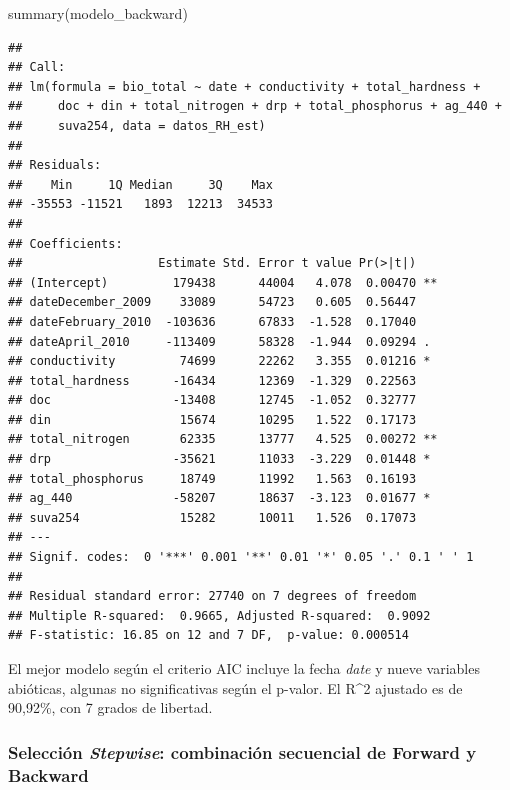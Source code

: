 \documentclass[
]{book}
\newenvironment{Shaded}{\begin{snugshade}}{\end{snugshade}}
\newcommand{\FunctionTok}[1]{\textcolor[rgb]{0.00,0.00,0.00}{#1}}
\newcommand{\NormalTok}[1]{#1}
\begin{document}
\begin{Shaded}
\begin{Highlighting}[]
\FunctionTok{summary}\NormalTok{(modelo\_backward)}
\end{Highlighting}
\end{Shaded}

\begin{verbatim}
## 
## Call:
## lm(formula = bio_total ~ date + conductivity + total_hardness + 
##     doc + din + total_nitrogen + drp + total_phosphorus + ag_440 + 
##     suva254, data = datos_RH_est)
## 
## Residuals:
##    Min     1Q Median     3Q    Max 
## -35553 -11521   1893  12213  34533 
## 
## Coefficients:
##                   Estimate Std. Error t value Pr(>|t|)   
## (Intercept)         179438      44004   4.078  0.00470 **
## dateDecember_2009    33089      54723   0.605  0.56447   
## dateFebruary_2010  -103636      67833  -1.528  0.17040   
## dateApril_2010     -113409      58328  -1.944  0.09294 . 
## conductivity         74699      22262   3.355  0.01216 * 
## total_hardness      -16434      12369  -1.329  0.22563   
## doc                 -13408      12745  -1.052  0.32777   
## din                  15674      10295   1.522  0.17173   
## total_nitrogen       62335      13777   4.525  0.00272 **
## drp                 -35621      11033  -3.229  0.01448 * 
## total_phosphorus     18749      11992   1.563  0.16193   
## ag_440              -58207      18637  -3.123  0.01677 * 
## suva254              15282      10011   1.526  0.17073   
## ---
## Signif. codes:  0 '***' 0.001 '**' 0.01 '*' 0.05 '.' 0.1 ' ' 1
## 
## Residual standard error: 27740 on 7 degrees of freedom
## Multiple R-squared:  0.9665, Adjusted R-squared:  0.9092 
## F-statistic: 16.85 on 12 and 7 DF,  p-value: 0.000514
\end{verbatim}

El mejor modelo según el criterio AIC incluye la fecha \emph{date} y nueve variables abióticas, algunas no significativas según el p-valor. El R\^{}2 ajustado es de 90,92\%, con 7 grados de libertad.

\hypertarget{selecciuxf3n-stepwise-combinaciuxf3n-secuencial-de-forward-y-backward}{%
\subsubsection{\texorpdfstring{Selección \emph{Stepwise}: combinación secuencial de Forward y Backward}{Selección Stepwise: combinación secuencial de Forward y Backward}}\label{selecciuxf3n-stepwise-combinaciuxf3n-secuencial-de-forward-y-backward}}
\end{document}
